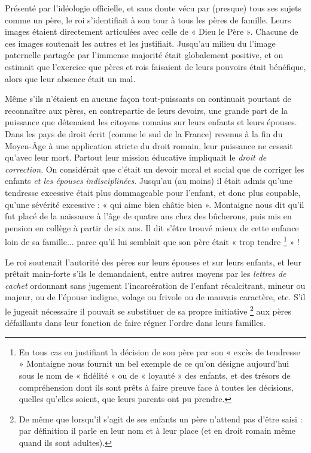 
 Présenté par l'idéologie officielle, et sans doute vécu par (presque) tous ses sujets comme un père, le roi s'identifiait à son tour à tous les pères de famille. Leurs images étaient directement articulées avec celle de « Dieu le Père ». Chacune de ces images soutenait les autres et les justifiait. Jusqu'au milieu du  l'image paternelle partagée par l'immense majorité était globalement positive, et on estimait que l'exercice que pères et rois faisaient de leurs pouvoirs était bénéfique, alors que leur absence était un mal.

 Même s'ils n'étaient en aucune façon tout-puissants on continuait pourtant de reconnaître aux pères, en contrepartie de leurs devoirs, une grande part de la puissance que détenaient les citoyens romains sur leurs enfants et leurs épouses. Dans les pays de droit écrit (comme le sud de la France) revenus à la fin du Moyen-Âge à une application stricte du droit romain, leur puissance ne cessait qu'avec leur mort. Partout leur mission éducative impliquait le \emph{droit de correction}. On considérait que c'était un devoir moral et social que de corriger les enfants \emph{et les épouses} \emph{indisciplinées}. Jusqu'au  (au moins) il était admis qu'une tendresse excessive était plus dommageable pour l'enfant, et donc plus coupable, qu'une sévérité excessive : « {qui aime bien châtie bien} ». Montaigne nous dit qu'il fut placé de la naissance à l'âge de quatre ans chez des bûcherons, puis mis en pension en collège à partir de six ans. Il dit s'être trouvé mieux de cette enfance loin de sa famille... parce qu'il lui semblait que son père était « trop tendre%
\footnote{En tous cas en justifiant la décision de son père par son « excès de tendresse » Montaigne nous fournit un bel exemple de ce qu'on désigne aujourd'hui sous le nom de « fidélité » ou de « loyauté » des enfants, et des trésors de compréhension dont ils sont prêts à faire preuve face à toutes les décisions, quelles qu'elles soient, que leurs parents ont pu prendre.} 
» !

 Le roi soutenait l'autorité des pères sur leurs épouses et sur leurs enfants, et leur prêtait main-forte s'ils le demandaient, entre autres moyens par les \emph{lettres de cachet} ordonnant sans jugement l'incarcération de l'enfant récalcitrant, mineur ou majeur, ou de l'épouse indigne, volage ou frivole ou de mauvais caractère, etc. S'il le jugeait nécessaire il pouvait se substituer de sa propre initiative%
\footnote{De même que lorsqu'il s'agit de ses enfants un père n'attend pas d'être saisi : par définition il parle en leur nom et à leur place (et en droit romain même quand ils sont adultes).} 
aux pères défaillants dans leur fonction de faire régner l'ordre dans leurs familles. 


